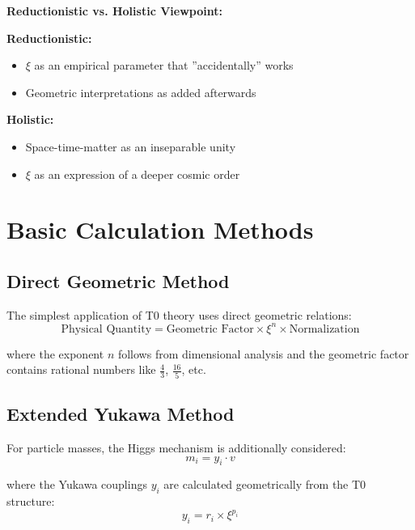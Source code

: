 	\begin{alternative}
		\textbf{Reductionistic vs. Holistic Viewpoint:}
		
		\textbf{Reductionistic:}
		\begin{itemize}
			\item $\xi$ as an empirical parameter that ''accidentally'' works
			\item Geometric interpretations as added afterwards
		\end{itemize}
		
		\textbf{Holistic:}
		\begin{itemize}
			\item Space-time-matter as an inseparable unity
			\item $\xi$ as an expression of a deeper cosmic order
		\end{itemize}
	\end{alternative}
	
	\section{Basic Calculation Methods}
	
	\subsection{Direct Geometric Method}
	
	The simplest application of T0 theory uses direct geometric relations:
	\begin{equation}
		\text{Physical Quantity} = \text{Geometric Factor} \times \xi^n \times \text{Normalization}
		\label{eq:direct_method}
	\end{equation}
	
	where the exponent $n$ follows from dimensional analysis and the geometric factor contains rational numbers like $\frac{4}{3}$, $\frac{16}{5}$, etc.
	
	\subsection{Extended Yukawa Method}
	
	For particle masses, the Higgs mechanism is additionally considered:
	\begin{equation}
		m_i = y_i \cdot v
		\label{eq:yukawa_method}
	\end{equation}
	
	where the Yukawa couplings $y_i$ are calculated geometrically from the T0 structure:
	\begin{equation}
		y_i = r_i \times \xi^{p_i}
		\label{eq:yukawa_coupling}
	\end{equation}
	
